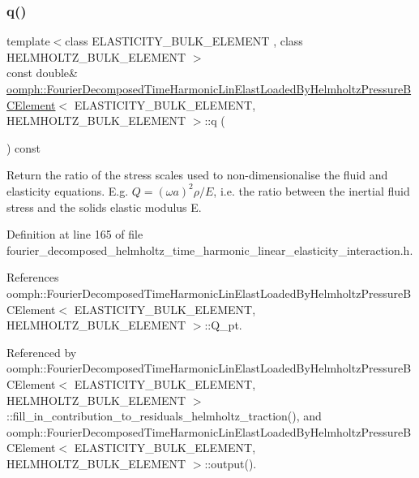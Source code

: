 \subsubsection{\texorpdfstring{q()}{q()}}
{\footnotesize\ttfamily template$<$class E\+L\+A\+S\+T\+I\+C\+I\+T\+Y\+\_\+\+B\+U\+L\+K\+\_\+\+E\+L\+E\+M\+E\+NT , class H\+E\+L\+M\+H\+O\+L\+T\+Z\+\_\+\+B\+U\+L\+K\+\_\+\+E\+L\+E\+M\+E\+NT $>$ \\
const double\& \hyperlink{classoomph_1_1FourierDecomposedTimeHarmonicLinElastLoadedByHelmholtzPressureBCElement}{oomph\+::\+Fourier\+Decomposed\+Time\+Harmonic\+Lin\+Elast\+Loaded\+By\+Helmholtz\+Pressure\+B\+C\+Element}$<$ E\+L\+A\+S\+T\+I\+C\+I\+T\+Y\+\_\+\+B\+U\+L\+K\+\_\+\+E\+L\+E\+M\+E\+NT, H\+E\+L\+M\+H\+O\+L\+T\+Z\+\_\+\+B\+U\+L\+K\+\_\+\+E\+L\+E\+M\+E\+NT $>$\+::q (\begin{DoxyParamCaption}{ }\end{DoxyParamCaption}) const\hspace{0.3cm}{\ttfamily [inline]}}



Return the ratio of the stress scales used to non-\/dimensionalise the fluid and elasticity equations. E.\+g. $ Q = (\omega a)^2 \rho/E $, i.\+e. the ratio between the inertial fluid stress and the solid\textquotesingle{}s elastic modulus E. 



Definition at line 165 of file fourier\+\_\+decomposed\+\_\+helmholtz\+\_\+time\+\_\+harmonic\+\_\+linear\+\_\+elasticity\+\_\+interaction.\+h.



References oomph\+::\+Fourier\+Decomposed\+Time\+Harmonic\+Lin\+Elast\+Loaded\+By\+Helmholtz\+Pressure\+B\+C\+Element$<$ E\+L\+A\+S\+T\+I\+C\+I\+T\+Y\+\_\+\+B\+U\+L\+K\+\_\+\+E\+L\+E\+M\+E\+N\+T, H\+E\+L\+M\+H\+O\+L\+T\+Z\+\_\+\+B\+U\+L\+K\+\_\+\+E\+L\+E\+M\+E\+N\+T $>$\+::\+Q\+\_\+pt.



Referenced by oomph\+::\+Fourier\+Decomposed\+Time\+Harmonic\+Lin\+Elast\+Loaded\+By\+Helmholtz\+Pressure\+B\+C\+Element$<$ E\+L\+A\+S\+T\+I\+C\+I\+T\+Y\+\_\+\+B\+U\+L\+K\+\_\+\+E\+L\+E\+M\+E\+N\+T, H\+E\+L\+M\+H\+O\+L\+T\+Z\+\_\+\+B\+U\+L\+K\+\_\+\+E\+L\+E\+M\+E\+N\+T $>$\+::fill\+\_\+in\+\_\+contribution\+\_\+to\+\_\+residuals\+\_\+helmholtz\+\_\+traction(), and oomph\+::\+Fourier\+Decomposed\+Time\+Harmonic\+Lin\+Elast\+Loaded\+By\+Helmholtz\+Pressure\+B\+C\+Element$<$ E\+L\+A\+S\+T\+I\+C\+I\+T\+Y\+\_\+\+B\+U\+L\+K\+\_\+\+E\+L\+E\+M\+E\+N\+T, H\+E\+L\+M\+H\+O\+L\+T\+Z\+\_\+\+B\+U\+L\+K\+\_\+\+E\+L\+E\+M\+E\+N\+T $>$\+::output().

